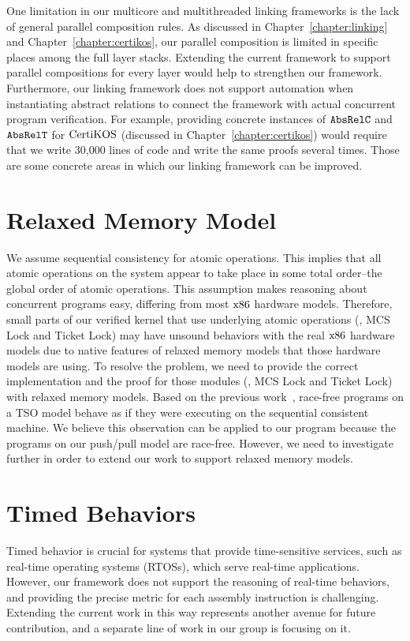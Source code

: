 One limitation in our multicore and multithreaded linking frameworks is the lack of general parallel composition rules. 
As discussed in Chapter~\ref{chapter:linking} and Chapter~\ref{chapter:certikos}, 
our parallel composition is limited in specific places among the full layer stacks. Extending the current framework to support parallel compositions for every layer would help to strengthen our framework.
Furthermore, our linking framework does not support automation when instantiating abstract relations to connect the framework with actual concurrent program verification.
For example, providing concrete instances of ${{\mathrm{\texttt{AbsRelC}}}}$ and ${{\mathrm{\texttt{AbsRelT}}}}$ for $\mathrm{CertiKOS}$ (discussed in Chapter~\ref{chapter:certikos}) 
would require that we write 30,000 lines of code and write the same proofs several times. 
Those are some concrete areas in which our linking framework can be improved. 

\section{Relaxed Memory Model}

We assume sequential consistency for atomic operations. 
This implies that all atomic operations on the system appear to take place in some total order--the global order of atomic operations.
This assumption makes reasoning about concurrent programs easy, differing from most $\mathrm{x86}$
 hardware models. 
Therefore, small parts of our verified kernel that use underlying atomic operations (\ie, MCS Lock and Ticket Lock) may have unsound behaviors with the real $\mathrm{x86}$ hardware models due to native features of relaxed memory models that those hardware models are using. 
To resolve the problem, we need to provide the correct implementation and the proof for those modules (\ie, MCS Lock and Ticket Lock) with relaxed memory models. 
Based on the previous work~\cite{sevcik13}, 
race-free programs on a TSO model behave as if they were executing on the sequential consistent machine. 
We believe this observation can be applied to our program because the programs on our push/pull model are race-free. 
However, we need to investigate further in order to extend our work to support relaxed memory models. 


\section{Timed Behaviors}

Timed behavior is crucial for systems that provide time-sensitive services, such as real-time operating systems (RTOSs), 
which serve real-time applications. 
However, our framework does not support the reasoning of real-time behaviors, 
and providing the precise metric for each assembly instruction is challenging. 
Extending the current work in this way represents another avenue for future contribution, 
and a separate line of work in our group is focusing on it. 


